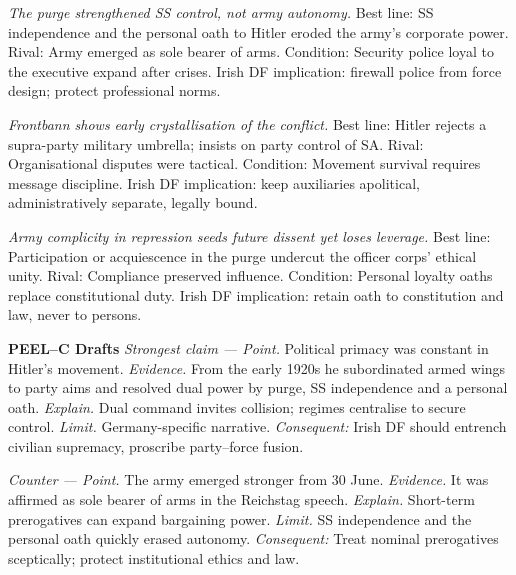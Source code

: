 \textit{The purge strengthened SS control, not army autonomy.}
Best line: SS independence and the personal oath to Hitler eroded the army’s corporate power.
Rival: Army emerged as sole bearer of arms.
Condition: Security police loyal to the executive expand after crises.
Irish DF implication: firewall police from force design; protect professional norms.

\textit{Frontbann shows early crystallisation of the conflict.}
Best line: Hitler rejects a supra-party military umbrella; insists on party control of SA.
Rival: Organisational disputes were tactical.
Condition: Movement survival requires message discipline.
Irish DF implication: keep auxiliaries apolitical, administratively separate, legally bound.

\textit{Army complicity in repression seeds future dissent yet loses leverage.}
Best line: Participation or acquiescence in the purge undercut the officer corps’ ethical unity.
Rival: Compliance preserved influence.
Condition: Personal loyalty oaths replace constitutional duty.
Irish DF implication: retain oath to constitution and law, never to persons.

\textbf{PEEL–C Drafts}
\textit{Strongest claim — Point.} Political primacy was constant in Hitler’s movement.
\textit{Evidence.} From the early 1920s he subordinated armed wings to party aims and resolved dual power by purge, SS independence and a personal oath.
\textit{Explain.} Dual command invites collision; regimes centralise to secure control.
\textit{Limit.} Germany-specific narrative. \textit{Consequent:} Irish DF should entrench civilian supremacy, proscribe party–force fusion.

\textit{Counter — Point.} The army emerged stronger from 30 June.
\textit{Evidence.} It was affirmed as sole bearer of arms in the Reichstag speech.
\textit{Explain.} Short-term prerogatives can expand bargaining power.
\textit{Limit.} SS independence and the personal oath quickly erased autonomy. \textit{Consequent:} Treat nominal prerogatives sceptically; protect institutional ethics and law.

